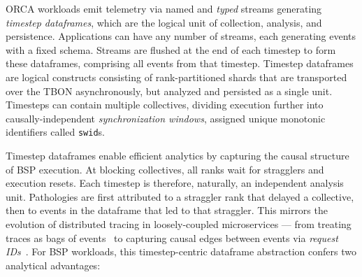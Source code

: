 ORCA workloads emit telemetry via named and \emph{typed} streams generating \emph{timestep
  dataframes}, which are the logical unit of collection, analysis, and persistence.
Applications can have any number of streams, each generating events with a fixed schema.
Streams are flushed at the end of each timestep to form these dataframes, comprising all events
from that timestep.
Timestep dataframes are logical constructs consisting of rank-partitioned shards that are
transported over the TBON asynchronously, but analyzed and persisted as a single unit.
Timesteps can contain multiple collectives, dividing execution further into causally-independent 
\emph{synchronization windows}, assigned unique monotonic identifiers called \texttt{swid}s.

Timestep dataframes enable efficient analytics by capturing the causal structure of BSP execution.
At blocking collectives, all ranks wait for stragglers and execution resets.
Each timestep is therefore, naturally, an independent analysis unit.
Pathologies are first attributed to a straggler rank that delayed a collective, then to events in
the dataframe that led to that straggler.
This mirrors the evolution of distributed tracing in loosely-coupled microservices --- from
treating traces as bags of events~\cite{Barha2004:Magpie} to capturing causal edges between events
via \emph{request IDs}~\cite{Fonse2007:X-Trace,Sigel2010:Dapper}.
For BSP workloads, this timestep-centric dataframe abstraction confers two analytical advantages:

\newcommand{\citeTracers}{Shend2006:TAU,Knupf2012:Score-P,Devar2024:DFTracer,Boehm2016:Caliper,2025:PytorchKineto}



